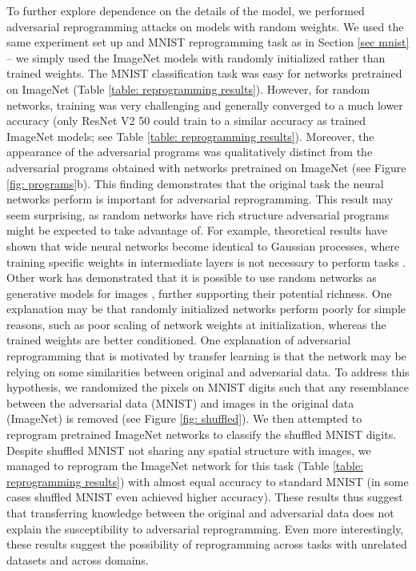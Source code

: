 \documentclass{article}
\begin{document}
To further explore dependence on the details of the model, we performed adversarial reprogramming attacks on models with random weights.
We used the same experiment set up and MNIST reprogramming task as in Section \ref{sec mnist} -- we simply used the ImageNet models with randomly initialized rather than trained weights.
The MNIST classification task was easy for networks pretrained on ImageNet (Table \ref{table: reprogramming results}). However, for random networks, training was very challenging and generally converged to a much lower accuracy (only ResNet V2 50 could train to a similar accuracy as trained ImageNet models; see Table \ref{table: reprogramming results}). Moreover, the appearance of the adversarial programs was qualitatively distinct from the adversarial programs obtained with networks pretrained on ImageNet (see Figure \ref{fig: programs}b). This finding demonstrates that the original task the neural networks perform is important for adversarial reprogramming.   
 This result may seem surprising, as random networks have rich structure adversarial programs might be expected to take advantage of. 
 For example, theoretical results have shown that wide neural networks become identical to Gaussian processes, where training specific weights in intermediate layers is not necessary to perform tasks \citep{matthews2018gaussian,lee2017deep}. Other work has demonstrated that it is possible to use random networks as generative models for images \citep{ustyuzhaninov2016texture, he2016powerful}, further supporting their potential richness. One explanation may be that randomly initialized networks perform poorly for simple reasons, such as poor scaling of network weights at initialization, whereas the trained weights are better conditioned. 
One explanation of adversarial reprogramming that is motivated by transfer learning  \citep{yosinski2014transferable} is that the network may be relying on some similarities between original and adversarial data. To address this hypothesis, we randomized the pixels on MNIST digits such that any resemblance between the adversarial data (MNIST) and images in the original data (ImageNet) is removed (see Figure \ref{fig: shuffled}). We then attempted to reprogram pretrained ImageNet networks to classify the shuffled MNIST digits. Despite shuffled MNIST not sharing any spatial structure with images, we managed to reprogram the ImageNet network for this task (Table \ref{table: reprogramming results}) with almost equal accuracy to standard MNIST (in some cases shuffled MNIST even achieved higher accuracy). These results thus suggest that transferring knowledge between the original and adversarial data does not explain the susceptibility to adversarial reprogramming. Even more interestingly, these results suggest the possibility of reprogramming across tasks with unrelated datasets and across domains.
\end{document}

